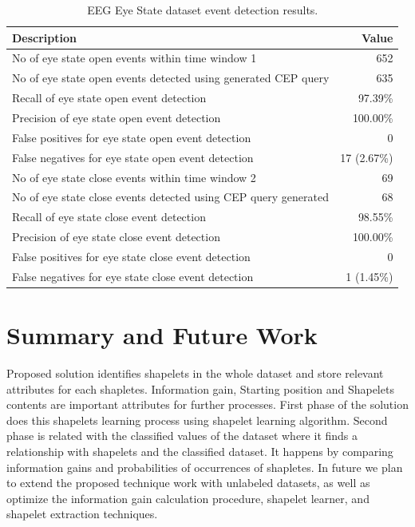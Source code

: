 \documentclass[conference]{IEEEtran}  %
\begin{document}
\begin{table}
\caption{EEG Eye State dataset event detection results.}
\begin{center}
\begin{tabular}{ | m{6cm} | m{2.3cm}| } 
 \hline 
\textbf{Description} & \multicolumn{1}{|r|}{\textbf{Value}}\\
\hline
No of eye state open events within time window 1 & \multicolumn{1}{|r|}{652}\\
\hline
No of eye state open events detected using generated CEP query & \multicolumn{1}{|r|}{635}\\
\hline
Recall of eye state open event detection & \multicolumn{1}{|r|}{97.39\%}\\
\hline
Precision of eye state open event detection & \multicolumn{1}{|r|}{100.00\%}\\
\hline
False positives for eye state open event detection & \multicolumn{1}{|r|}{0}\\
\hline
False negatives for eye state open event detection & \multicolumn{1}{|r|}{17 (2.67\%)}\\
\hline
No of eye state close events within time window 2 & \multicolumn{1}{|r|}{69}\\
\hline
No of eye state close events detected using CEP query generated & \multicolumn{1}{|r|}{68}\\
\hline
Recall of eye state close event detection & \multicolumn{1}{|r|}{98.55\%}\\
\hline
Precision of eye state close event detection & \multicolumn{1}{|r|}{100.00\%}\\
\hline
False positives for eye state close event detection & \multicolumn{1}{|r|}{0}\\
\hline
False negatives for eye state close event detection & \multicolumn{1}{|r|}{1 (1.45\%)}\\
\hline

\end{tabular}
\end{center}
\end{table}

\section{Summary and Future Work}

Proposed solution identifies shapelets in the whole dataset and store relevant attributes for each shapletes. Information gain, Starting position and Shapelets contents are important attributes for further processes. First phase of the solution does this shapelets learning process using shapelet learning algorithm. Second phase is related with the classified values of the dataset where it finds a relationship with shapelets and the classified dataset. It happens by comparing information gains and probabilities of occurrences of shapletes. In future we plan to extend the proposed technique work with unlabeled datasets, as well as optimize the information gain calculation procedure, shapelet learner, and shapelet extraction techniques.

\nocite{*}


\end{document}
